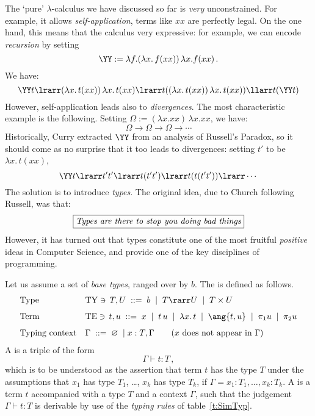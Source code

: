 \documentclass[12pt]{article}
\begin{document}
The `pure' $\lambda$-calculus we have discussed so far is \emph{very} unconstrained. For example, it allows \emph{self-application}, \ie terms like $xx$ are perfectly legal. On the one hand, this means that the calculus very expressive: for example, we can encode \emph{recursion} by setting
\[ \YY := \lambda f.  (\lambda x. \, f(x x))\,\lambda x.  f(x x)\,. \]
We have:
\[ \YY t \lrarr (\lambda x. \, t(x x)) \,\lambda x. \, t(x x) \lrarr t ((\lambda x. \, t(x x))\,\lambda x. \, t(x x)) \llarr t(\YY t) \]
%
However, self-application leads also to \emph{divergences}. The most characteristic example is the following. Setting $\Omega :=(\lambda x.xx)\,\lambda x.xx$, we have:
\[ \Omega \longrightarrow \Omega \longrightarrow \Omega \longrightarrow \cdots \]
Historically, Curry extracted $\YY$ from an analysis of Russell's Paradox, so it should come as no surprise that it too leads to divergences:
setting $t'$ to be $\lambda x. \, t(x x)$,
\[ \YY t \lrarr t't' \lrarr t(t't')\lrarr t(t(t't')) \lrarr \cdots \]
%
The solution is to introduce \emph{types}.  The original idea, due to Church following Russell, was that:
\[ \fbox{\textit{Types are there to stop you doing bad things}} \]
However, it has turned out that types constitute one of the most fruitful \emph{positive} ideas in Computer Science, and provide  one of the
key disciplines of programming.
%
\begin{mydefinition}
Let us assume a set of \emph{base types}, ranged over by $b$. The  is defined as follows.
\begin{align*}
&\text{Type} &&
\mathrm{TY}\ni\, T,U \; ::= \; b \; \mid \; T \rarr U \; \mid \; T \times U %
\\[1.5mm]
&\text{Term} && \mathrm{TE}\ni\,t,u\; ::= \; x \; \mid \; {t\,u} \;\mid\; {\lambda x.\, t} \;\mid\; \ang{t,u} \;\mid\; \pi_1u \;\mid\; \pi_2u \\[1.5mm]
&\text{Typing context} && \Gamma \;::=\; \varnothing\; \mid x : T,\Gamma \qquad(x\text{ does not appear in }\Gamma)
\end{align*}
A  is a triple of the form
\[ \Gamma \vdash t : T\,, \]
which is to be understood as the assertion that term $t$ has the type $T$ under the assumptions that $x_{1}$ has type $T_{1}$, \ldots , $x_{k}$ has type $T_{k}$, if $\Gamma = x_{1}:T_{1}, \ldots , x_{k} : T_{k}$. A  is a term $t$ accompanied with a type $T$ and a context $\Gamma$, such that the judgement $\Gamma\vdash t:T$ is derivable by use of the \emph{typing rules} of table~\ref{t:SimTyp}.
\deq
\end{mydefinition}
\end{document}

